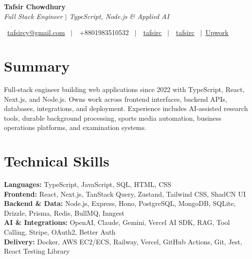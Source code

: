 \documentclass[letterpaper,11pt]{article}
\newcommand{\resumeSubHeadingListStart}{\begin{itemize}[leftmargin=0.15in, label={}]}
\newcommand{\resumeSubHeadingListEnd}{\end{itemize}}
\begin{document}
\begin{center}
    {\Huge \textbf{Tafsir Chowdhury}} \\
    \vspace{5pt}
    {\large \textit{Full Stack Engineer $|$ TypeScript, Node.js \& Applied AI}}
    \vspace{8pt}

    \small
    \faEnvelope\ \href{mailto:tafsircy@gmail.com}{tafsircy@gmail.com} \ $|$\
    \faPhone\ +8801983510532 \ $|$\
    \faLinkedin\ \href{https://www.linkedin.com/in/tafsirc}{tafsirc} \ $|$\
    \faGithub\ \href{https://github.com/tafsirc}{tafsirc} \ $|$\
    \href{https://www.upwork.com/freelancers/~01a150d13d45613490}{Upwork}
\end{center}

\section{Summary}
\small{Full-stack engineer building web applications since 2022 with TypeScript, React, Next.js, and Node.js. Owns work across frontend interfaces, backend APIs, databases, integrations, and deployment. Experience includes AI-assisted research tools, durable background processing, sports media automation, business operations platforms, and examination systems.}

\section{Technical Skills}
  \resumeSubHeadingListStart
    \small{\item{
     \textbf{Languages:}{ TypeScript, JavaScript, SQL, HTML, CSS} \\[2pt]
     \textbf{Frontend:}{ React, Next.js, TanStack Query, Zustand, Tailwind CSS, ShadCN UI} \\[2pt]
     \textbf{Backend \& Data:}{ Node.js, Express, Hono, PostgreSQL, MongoDB, SQLite, Drizzle, Prisma, Redis, BullMQ, Inngest} \\[2pt]
     \textbf{AI \& Integrations:}{ OpenAI, Claude, Gemini, Vercel AI SDK, RAG, Tool Calling, Stripe, OAuth2, Better Auth} \\[2pt]
     \textbf{Delivery:}{ Docker, AWS EC2/ECS, Railway, Vercel, GitHub Actions, Git, Jest, React Testing Library}
    }}
  \resumeSubHeadingListEnd

\end{document}
